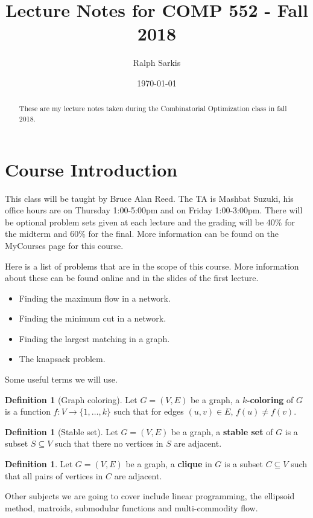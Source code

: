 \documentclass{tufte-handout}
\title{Lecture Notes for COMP 552 - Fall 2018}
\author[Ralph Sarkis]{Ralph Sarkis}
\date{\today}  %
\theoremstyle{definition}
\newtheorem{defn}[thm]{Definition}
\theoremstyle{remark}
\begin{document}
\maketitle
\begin{abstract}
These are my lecture notes taken during the Combinatorial Optimization class in fall 2018.
\end{abstract}
\tableofcontents
\section{Course Introduction}
This class will be taught by Bruce Alan Reed. The TA is Mashbat Suzuki, his office hours are on Thursday 1:00-5:00pm and on Friday 1:00-3:00pm. There will be optional problem sets given at each lecture and the grading will be 40\% for the midterm and 60\% for the final. More information can be found on the MyCourses page for this course.

Here is a list of problems that are in the scope of this course. More information about these can be found online and in the slides of the first lecture.

\begin{itemize}
	\item Finding the maximum flow in a network.
	\item Finding the minimum cut in a network.
	\item Finding the largest matching in a graph.
	\item The knapsack problem.
\end{itemize}
Some useful terms we will use.
\begin{defn}[Graph coloring]
	Let $G= (V,E)$ be a graph, a \textbf{$k$-coloring} of $G$ is a function $f: V \rightarrow \{1,\dots, k\}$ such that for edges $(u, v) \in E$, $f(u) \neq f(v)$.
\end{defn}
\begin{defn}[Stable set]
	Let $G=(V,E)$ be a graph, a \textbf{stable set} of $G$ is a subset $S \subseteq V$ such that there no vertices in $S$ are adjacent.
\end{defn}
\begin{defn}
	Let $G=(V,E)$ be a graph, a \textbf{clique} in $G$ is a subset $C \subseteq V$ such that all pairs of vertices in $C$ are adjacent.
\end{defn}

Other subjects we are going to cover include linear programming, the ellipsoid method, matroids, submodular functions and multi-commodity flow.
\end{document}
